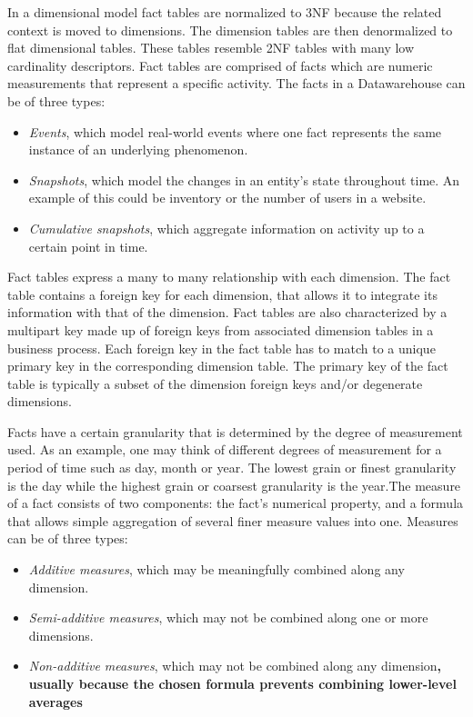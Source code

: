 \documentclass[]{article}
\begin{document}
In a dimensional model fact tables are normalized to 3NF because the related context is moved to dimensions. The dimension tables are
then denormalized to flat dimensional tables. These tables resemble 2NF tables with many low cardinality descriptors. Fact tables are
comprised of facts which are numeric measurements that represent a specific activity. The facts in a Datawarehouse can be of three types:
\begin{itemize}
	\item \emph{Events}, which model real-world events where one fact represents the same instance of an underlying phenomenon. 
	\item \emph{Snapshots}, which model the changes in an entity's state throughout time. An example of this could be inventory or the number of users in a website.
	\item \emph{Cumulative snapshots}, which aggregate information on activity up to a certain point in time.
\end{itemize}
Fact tables express a many to many relationship with each dimension. The fact table contains a foreign key for each dimension, that
allows it to integrate its information with that of the dimension. Fact tables are also characterized by a multipart key made up of
foreign keys from associated dimension tables in a business process. Each foreign key in the fact table has to match to a unique
primary key in the corresponding dimension table. The primary key of the fact table is typically a subset of the dimension foreign keys
and/or degenerate dimensions.

Facts have a certain granularity that is determined by the degree of measurement used. As an example, one may think of different degrees
of measurement for a period of time such as day, month or year. The lowest grain or finest granularity is the day while the highest
grain or coarsest granularity is the year.The measure of a fact consists of two components: the fact's numerical property, and a formula
that allows simple aggregation of several finer measure values into one. Measures can be of three types:
\begin{itemize}
\item \emph{Additive measures}, which may be meaningfully combined along any dimension.
\item \emph{Semi-additive measures}, which may not be combined along one or more dimensions.
\item \emph{Non-additive measures}, which may not be combined along any dimension\textbf{, usually because the chosen formula prevents combining lower-level averages}
\end{itemize}
\end{document}
